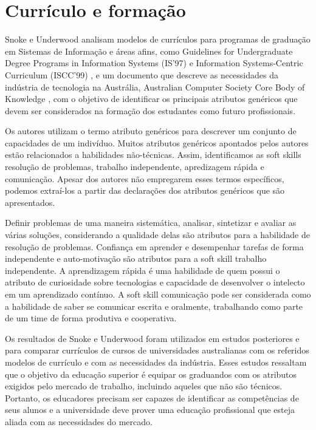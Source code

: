 \section{Currículo e formação}

Snoke e Underwood \cite{snoke:01} analisam modelos de currículos para programas de graduação em Sistemas de Informação e áreas afins,
como  Guidelines for Undergraduate Degree Programs in Information Systems (IS’97) \cite{is97}
e     Information Systems-Centric Curriculum (ISCC'99) \cite{iscc99},
e um documento que descreve as necessidades da indústria de tecnologia na Austrália,
Australian Computer Society Core Body of Knowledge \cite{acs},
com o objetivo de identificar os principais atributos genéricos que devem ser considerados na formação dos estudantes como futuro profissionais.

Os autores utilizam o termo atributo genéricos para descrever um conjunto de capacidades de um indivíduo. Muitos atributos genéricos apontados pelos autores estão relacionados a habilidades não-técnicas. Assim, identificamos as soft skills resolução de problemas, trabalho independente, apredizagem rápida e comunicação. Apesar dos autores não empregarem esses termos específicos, podemos extraí-los a partir das declarações dos atributos genéricos que são apresentados.

Definir problemas de uma maneira sistemática, analisar, sintetizar e avaliar as várias soluções, considerando a qualidade delas são atributos para a habilidade de resolução de problemas. Confiança em aprender e desempenhar tarefas de forma independente e auto-motivação são atributos para a soft skill trabalho independente. A aprendizagem rápida é uma habilidade de quem possui o atributo de curiosidade sobre tecnologias e capacidade de desenvolver o intelecto em um aprendizado contínuo. A soft skill comunicação pode ser considerada como a habilidade de saber se comunicar escrita e oralmente, trabalhando como parte de um time de forma produtiva e cooperativa.

Os resultados de Snoke e Underwood \cite{snoke:01} foram utilizados em estudos posteriores \cite{snoke:02} e \cite{snoke:03} para comparar currículos de cursos de universidades australianas com os referidos modelos de currículo e com as necessidades da indústria. 
Esses estudos ressaltam que o objetivo da educação superior é equipar os graduandos com os atributos exigidos pelo mercado de trabalho, incluindo aqueles que não são técnicos. Portanto, os educadores precisam ser capazes de identificar as competências de seus alunos e a universidade deve prover uma educação profissional que esteja aliada com as necessidades do mercado.

